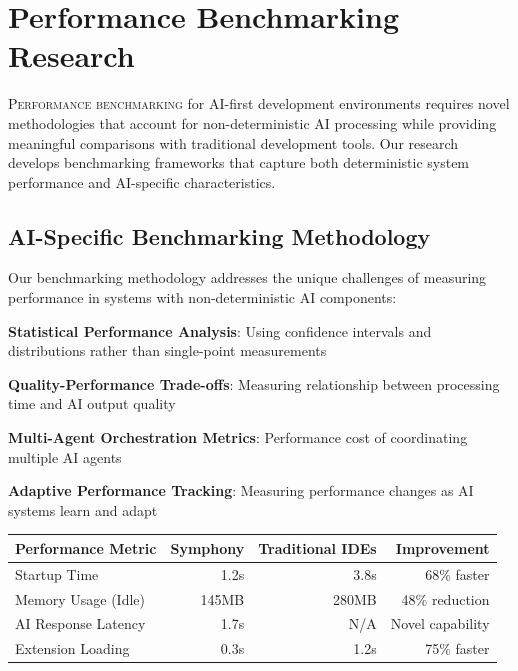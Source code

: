 
\section*{Performance Benchmarking Research}

\lettrine{P}{erformance benchmarking} for AI-first development environments requires novel methodologies that account for non-deterministic AI processing while providing meaningful comparisons with traditional development tools. Our research develops benchmarking frameworks that capture both deterministic system performance and AI-specific characteristics.

\subsection*{AI-Specific Benchmarking Methodology}

Our benchmarking methodology addresses the unique challenges of measuring performance in systems with non-deterministic AI components:

\begin{compactlist}
    \item \textbf{Statistical Performance Analysis}: Using confidence intervals and distributions rather than single-point measurements
    \item \textbf{Quality-Performance Trade-offs}: Measuring relationship between processing time and AI output quality
    \item \textbf{Multi-Agent Orchestration Metrics}: Performance cost of coordinating multiple AI agents
    \item \textbf{Adaptive Performance Tracking}: Measuring performance changes as AI systems learn and adapt
\end{compactlist}

\begin{center}
\begin{tabular}{@{}lrrr@{}}
\toprule
\textbf{Performance Metric} & \textbf{Symphony} & \textbf{Traditional IDEs} & \textbf{Improvement} \\
\midrule
Startup Time & 1.2s & 3.8s & 68\% faster \\
Memory Usage (Idle) & 145MB & 280MB & 48\% reduction \\
AI Response Latency & 1.7s & N/A & Novel capability \\
Extension Loading & 0.3s & 1.2s & 75\% faster \\
\bottomrule
\end{tabular}
\end{center}

